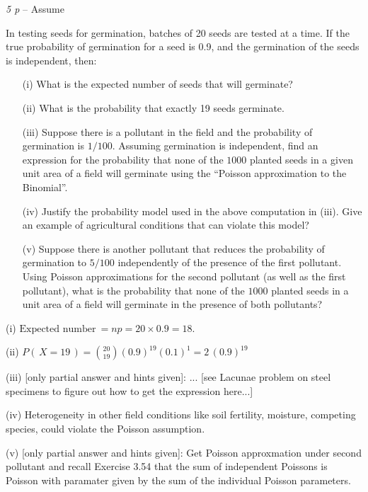 \documentclass[11pt,paper=a4,abstract=on,parskip=half,DIV=calc,compact]{scrartcl}
\begin{document}
\begin{ExerciseList}
\Exercise
 {\em 5 p} -- Assume 
{
In testing
 seeds for germination, batches of 20 seeds are tested at a time.
If the true probability of germination for a seed is 0.9, and the germination
of the seeds is independent, then:
\begin{enumerate}
\item[(i)] What is the expected number of seeds that will germinate?
\item[(ii)] What is the probability that exactly 19 seeds germinate.
\item[(iii)] Suppose there is a pollutant in the field and the probability of germination is $1/100$. Assuming germination is independent, find an expression for the probability that none of the $1000$ planted seeds in a given unit area of a field will germinate using the ``Poisson approximation to the Binomial''. 
\item[(iv)] Justify the probability model used in the above computation in (iii). Give an example of agricultural conditions that can violate this model? 
\item[(v)] Suppose there is another pollutant that reduces the probability of germination to $5/100$ independently of the presence of the first pollutant. Using Poisson approximations for the second pollutant (as well as the first pollutant), what is the probability that none of the $1000$ planted seeds in a unit area of a field will germinate in the presence of both pollutants?
\end{enumerate}
}
\Answer
{
(i) \qquad $\text{Expected number}\ = np = 20\times 0.9 = 18.$

(ii) \qquad $P( \, X = 19 \,) = \binom{20}{19}   (0.9)^{19}(0.1)^1 = 2 \, (0.9)^{19} $

(iii) [only partial answer and hints given]: ... [see Lacunae problem on steel specimens to figure out how to get the expression here...]

(iv) Heterogeneity in other field conditions like soil fertility, moisture, competing species, could violate the Poisson assumption.

(v) [only partial answer and hints given]: Get Poisson approxmation under second pollutant and recall Exercise 3.54 that the sum of independent Poissons is Poisson with paramater given by the sum of the individual Poisson parameters.
}


\end{ExerciseList}
\end{document}
